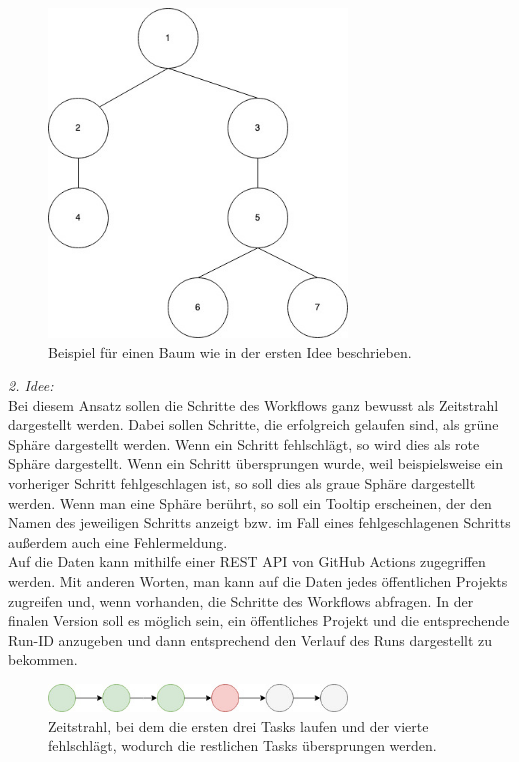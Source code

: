 \documentclass{article}
\begin{document}
\begin{figure}[htbp]
\centering
\includegraphics[width=300px]{./img/Idee1.jpg}
\caption{\label{fig:orgbd88146}Beispiel für einen Baum wie in der ersten Idee beschrieben.}
\end{figure}

\emph{2. Idee:}\\[0pt]
Bei diesem Ansatz sollen die Schritte des Workflows ganz bewusst als Zeitstrahl dargestellt werden. Dabei sollen Schritte, die erfolgreich gelaufen sind, als grüne Sphäre dargestellt werden. Wenn ein Schritt fehlschlägt, so wird dies als rote Sphäre dargestellt. Wenn ein Schritt übersprungen wurde, weil beispielsweise ein vorheriger Schritt fehlgeschlagen ist, so soll dies als graue Sphäre dargestellt werden. Wenn man eine Sphäre berührt, so soll ein Tooltip erscheinen, der den Namen des jeweiligen Schritts anzeigt bzw. im Fall eines fehlgeschlagenen Schritts außerdem auch eine Fehlermeldung.\\[0pt]
Auf die Daten kann mithilfe einer REST API von GitHub Actions zugegriffen werden. Mit anderen Worten, man kann auf die Daten jedes öffentlichen Projekts zugreifen und, wenn vorhanden, die Schritte des Workflows abfragen. In der finalen Version soll es möglich sein, ein öffentliches Projekt und die entsprechende Run-ID anzugeben und dann entsprechend den Verlauf des Runs dargestellt zu bekommen.

\largeskip

\begin{figure}[htbp]
\centering
\includegraphics[width=300px]{./img/Idee2.jpg}
\caption{\label{fig:org084e5ca}Zeitstrahl, bei dem die ersten drei Tasks laufen und der vierte fehlschlägt, wodurch die restlichen Tasks übersprungen werden.}
\end{figure}
\end{document}
